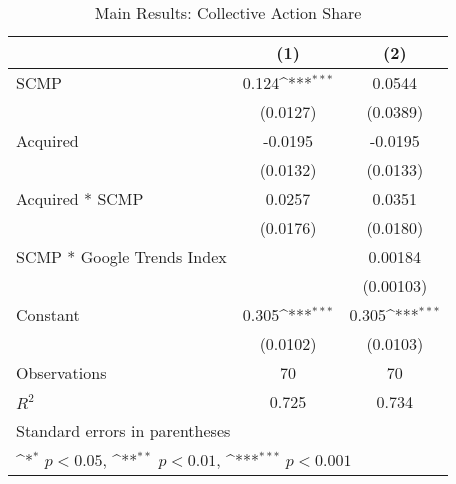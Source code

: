 \begin{table}[htbp]\centering
\def\sym#1{\ifmmode^{#1}\else\(^{#1}\)\fi}
\caption{Main Results: Collective Action Share\label{coll}}
\begin{tabular*}{0.75\textwidth}{@{\hskip\tabcolsep\extracolsep\fill}l*{2}{c}}
\hline\hline
                &\multicolumn{1}{c}{(1)}         &\multicolumn{1}{c}{(2)}         \\
\hline
SCMP            &    0.124\sym{***}&   0.0544         \\
                & (0.0127)         & (0.0389)         \\
[1em]
Acquired        &  -0.0195         &  -0.0195         \\
                & (0.0132)         & (0.0133)         \\
[1em]
Acquired * SCMP &   0.0257         &   0.0351         \\
                & (0.0176)         & (0.0180)         \\
[1em]
SCMP * Google Trends Index&                  &  0.00184         \\
                &                  &(0.00103)         \\
[1em]
Constant        &    0.305\sym{***}&    0.305\sym{***}\\
                & (0.0102)         & (0.0103)         \\
\hline
Observations    &       70         &       70         \\
\(R^{2}\)       &    0.725         &    0.734         \\
\hline\hline
\multicolumn{3}{l}{\footnotesize Standard errors in parentheses}\\
\multicolumn{3}{l}{\footnotesize \sym{*} \(p<0.05\), \sym{**} \(p<0.01\), \sym{***} \(p<0.001\)}\\
\end{tabular*}
\end{table}
